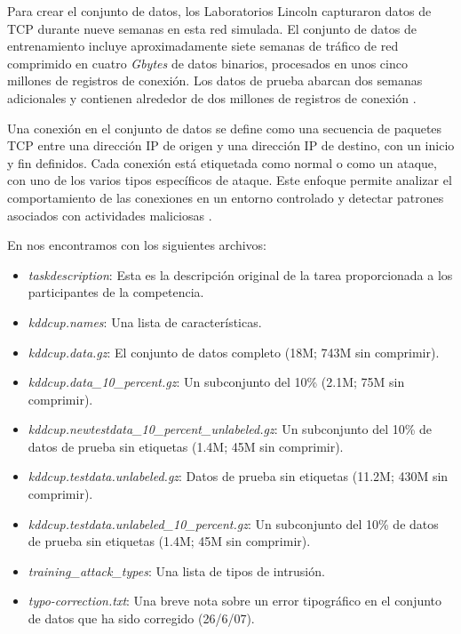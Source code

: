 \newpage

Para crear el conjunto de datos, los Laboratorios Lincoln capturaron datos de TCP durante nueve semanas en esta red simulada. El conjunto de datos de entrenamiento incluye aproximadamente siete semanas de tráfico de red comprimido en cuatro \textit{Gbytes} de datos binarios, procesados en unos cinco millones de registros de conexión. Los datos de prueba abarcan dos semanas adicionales y contienen alrededor de dos millones de registros de conexión \citep{kddcup99}.

Una conexión en el conjunto de datos se define como una secuencia de paquetes TCP entre una dirección IP de origen y una dirección IP de destino, con un inicio y fin definidos. Cada conexión está etiquetada como normal o como un ataque, con uno de los varios tipos específicos de ataque. Este enfoque permite analizar el comportamiento de las conexiones en un entorno controlado y detectar patrones asociados con actividades maliciosas \citep{kddcup99}.

En \citep{kddcup99} nos encontramos con los siguientes archivos:

\begin{itemize}
    \item \textit{taskdescription}: Esta es la descripción original de la tarea proporcionada a los participantes de la competencia.
    \item \textit{kddcup.names}: Una lista de características.
    \item \textit{kddcup.data.gz}: El conjunto de datos completo (18M; 743M sin comprimir).
    \item \textit{kddcup.data\_10\_percent.gz}: Un subconjunto del 10\% (2.1M; 75M sin comprimir).
    \item \textit{kddcup.newtestdata\_10\_percent\_unlabeled.gz}: Un subconjunto del 10\% de datos de prueba sin etiquetas (1.4M; 45M sin comprimir).
    \item \textit{kddcup.testdata.unlabeled.gz}: Datos de prueba sin etiquetas (11.2M; 430M sin comprimir).
    \item \textit{kddcup.testdata.unlabeled\_10\_percent.gz}: Un subconjunto del 10\% de datos de prueba sin etiquetas (1.4M; 45M sin comprimir).
    \item \textit{training\_attack\_types}: Una lista de tipos de intrusión.
    \item \textit{typo-correction.txt}: Una breve nota sobre un error tipográfico en el conjunto de datos que ha sido corregido (26/6/07).
\end{itemize}

